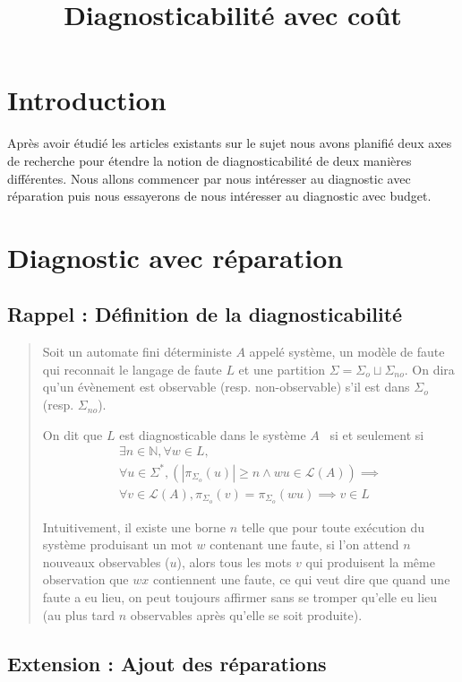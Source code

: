 \documentclass[a4paper,10pt]{article}
\title{Diagnosticabilit\'e avec co\^ut}
\begin{document}
\section*{Introduction}

Après avoir étudié les articles existants sur le sujet nous avons planifié deux axes de recherche pour étendre la notion de diagnosticabilité de deux manières différentes. Nous allons commencer par nous intéresser au diagnostic avec réparation puis nous essayerons de nous intéresser au diagnostic avec budget.

\section{Diagnostic avec r\'eparation}
\subsection{Rappel : Définition de la diagnosticabilité}
\begin{quote}
Soit un automate fini d\'eterministe $A$ appel\'e syst\`eme, un modèle de faute qui reconnait le langage de faute $L$ et une partition $\Sigma=\Sigma_o\sqcup \Sigma_{no}$. On dira qu'un \'ev\`enement est observable (resp. non-observable) s'il est dans $\Sigma_o$ (resp. $\Sigma_{no}$).

On dit que $L$ est diagnosticable dans le système $A$~\cite{SamSRST96}  si et seulement si $$\begin{array}{l}
\exists n \in \mathbb N, \forall w \in L,\\
\forall u \in \Sigma^*, \left(\left|\pi_{\Sigma_o}(u)\right|\ge n \land wu \in \mathcal L(A)\right) \implies\\
\forall v \in \mathcal L(A), \pi_{\Sigma_o}(v)=\pi_{\Sigma_o}(wu) \implies v \in L
\end{array}$$

Intuitivement, il existe une borne $n$ telle que pour toute ex\'ecution du système produisant un mot $w$ contenant une faute, si l'on attend $n$ nouveaux observables ($u$), alors tous les mots $v$ qui produisent la m\^eme observation que $wx$ contiennent une faute, ce qui veut dire que quand une faute a eu lieu, on peut toujours affirmer sans se tromper qu'elle eu lieu (au plus tard $n$ observables après qu'elle se soit produite).
\end{quote}

\subsection{Extension : Ajout des r\'eparations}
\end{document}
